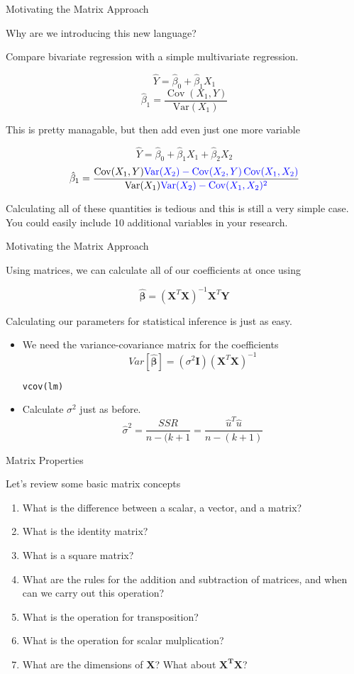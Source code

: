 \documentclass[11pt]{beamer}
\DeclareMathOperator*{\C}{Cov}
\newcommand{\V}{{\text{Var}}}
\begin{document}
\begin{frame}{Motivating the Matrix Approach}

Why are we introducing this new language? 

Compare bivariate regression with a simple multivariate regression.  

$$\hat{Y} = \hat{\beta}_0 + \hat{\beta}_1 X_1 $$
$$\hat{\beta}_1 = \frac{\C(X_1, Y)}{\V(X_1)}$$

This is pretty managable, but then add even just one more variable

$$\hat{Y} = \hat{\beta}_0 + \hat{\beta}_1 X_1 + \hat{\beta}_2 X_2$$
$$\hat{\beta}_1 = \frac{\C(X_1, Y)\textcolor{blue}{\V(X_2) - \C(X_2, Y)\C(X_1, X_2)}}{\V(X_1)\textcolor{blue}{\V(X_2) - \C(X_1, X_2)^2}}$$

Calculating all of these quantities is tedious and this is still a very simple case. You could easily include 10 additional variables in your research. 

\end{frame}

\begin{frame}{Motivating the Matrix Approach}

Using matrices, we can calculate all of our coefficients at once using

$$\hat{\bm{\beta}}=(\mathbf{X}^{T}\mathbf{X})^{-1}\mathbf{X}^{T}\mathbf{Y}$$

Calculating our parameters for statistical inference is just as easy. 

\begin{itemize}
\item We need the variance-covariance matrix for the coefficients
$$Var[\hat{\bm{\beta}}]=(\sigma^{2}\mathbf{I})(\mathbf{X}^{T}\mathbf{X})^{-1}$$
{\centering \texttt{vcov(lm)}\par}
\item Calculate $\sigma^{2}$ just as before. 
$$\hat{\sigma}^{2} = \frac{SSR}{n-(k+1}=\frac{\hat{u}^{T}\hat{u}}{n-(k+1)}$$
\end{itemize}


\end{frame}

\begin{frame}{Matrix Properties}

Let's review some basic matrix concepts

\begin{enumerate}
\item What is the difference between a scalar, a vector, and a matrix?
\item What is the identity matrix?
\item What is a square matrix?
\item What are the rules for the addition and subtraction of matrices, and when can we carry out this operation?
\item What is the operation for transposition?
\item What is the operation for scalar mulplication? 
\item What are the dimensions of $\mathbf{X}$? What about $\mathbf{X^{T}X}$?
\end{enumerate}
\end{frame}
\end{document}
